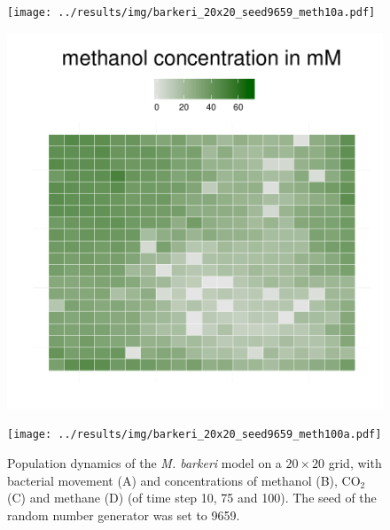 \begin{figure}[h!]
{  \begin{minipage}[t]{0.3\textwidth}
    \texttt{[image: ../results/img/barkeri\_20x20\_seed9659\_meth10a.pdf]}
  \end{minipage}
  \begin{minipage}[t]{0.3\textwidth}
    \includegraphics[width=\textwidth]{../results/img/barkeri_20x20_seed9659_meth75.pdf}
  \end{minipage}
  \begin{minipage}[t]{0.3\textwidth}
    \texttt{[image: ../results/img/barkeri\_20x20\_seed9659\_meth100a.pdf]}
  \end{minipage}
  }
  \caption{Population dynamics of the \emph{M. barkeri} model on a $20\times20$ grid, with bacterial movement (A) and concentrations of methanol (B), CO$_2$ (C) and methane (D) (of time step 10, 75 and 100). The seed of the random number generator was set to 9659.}
  \label{fig:barkerigrids}
\end{figure}


